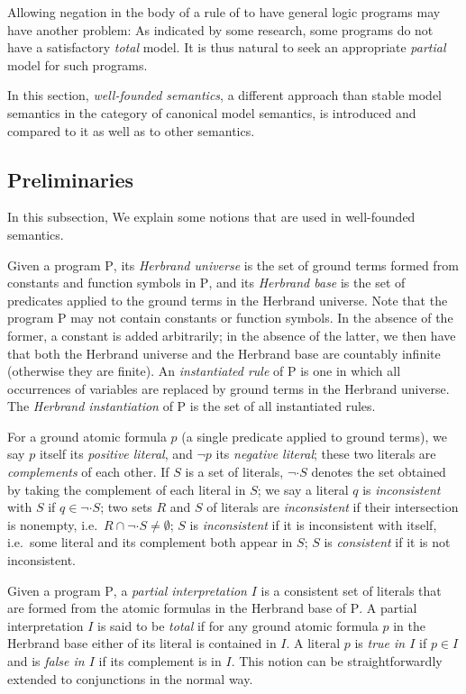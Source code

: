 Allowing negation in the body of a rule of to have general logic programs may have another problem: As indicated by some research, some programs do not have a satisfactory \emph{total} model. It is thus natural to seek an appropriate \emph{partial} model for such programs.

In this section, \emph{well-founded semantics}, a different approach than stable model semantics in the category of canonical model semantics, is introduced and compared to it as well as to other semantics.

\subsection{Preliminaries}
In this subsection, We explain some notions that are used in well-founded semantics.

Given a program $\mathrm{P}$, its \emph{Herbrand universe} is the set of ground terms formed from constants and function symbols in $\mathrm{P}$, and its \emph{Herbrand base} is the set of predicates applied to the ground terms in the Herbrand universe. Note that the program $\mathrm{P}$ may not contain constants or function symbols. In the absence of the former, a constant is added arbitrarily; in the absence of the latter, we then have that both the Herbrand universe and the Herbrand base are countably infinite (otherwise they are finite). An \emph{instantiated rule} of $\mathrm{P}$ is one in which all occurrences of variables are replaced by ground terms in the Herbrand universe. The \emph{Herbrand instantiation} of $\mathrm{P}$ is the set of all instantiated rules.

For a ground atomic formula $p$ (a single predicate applied to ground terms), we say $p$ itself its \emph{positive literal}, and $\neg p$ its \emph{negative literal}; these two literals are \emph{complements} of each other. If $S$ is a set of literals, $\neg \cdot S$ denotes the set obtained by taking the complement of each literal in $S$; we say a literal $q$ is \emph{inconsistent} with $S$ if $q \in \neg \cdot S$; two sets $R$ and $S$ of literals are \emph{inconsistent} if their intersection is nonempty, i.e.\ $R \cap \neg \cdot S \neq \emptyset$; $S$ is \emph{inconsistent} if it is inconsistent with itself, i.e.\ some literal and its complement both appear in $S$; $S$ is \emph{consistent} if it is not inconsistent.

Given a program $\mathrm{P}$, a \emph{partial interpretation} $I$ is a consistent set of literals that are formed from the atomic formulas in the Herbrand base of $\mathrm{P}$. A partial interpretation $I$ is said to be \emph{total} if for any ground atomic formula $p$ in the Herbrand base either of its literal is contained in $I$. A literal $p$ is \emph{true in $I$} if $p \in I$ and is \emph{false in $I$} if its complement is in $I$. This notion can be straightforwardly extended to conjunctions in the normal way.


